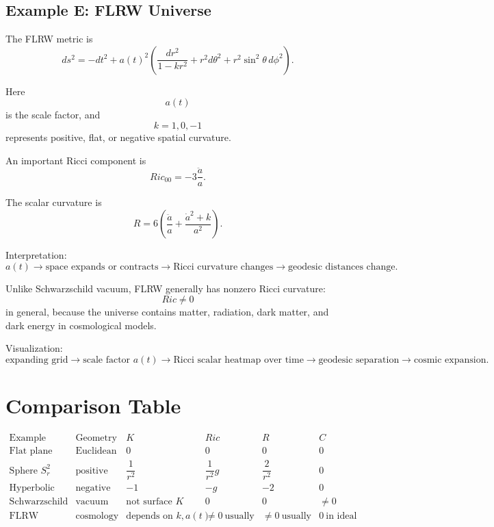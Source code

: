 \documentclass[12pt,a4paper]{article}
\theoremstyle{notespace}
\begin{document}
\subsection{Example E: FLRW Universe}

The FLRW metric is
\[
ds^2
=
-dt^2
+
a(t)^2
\left(
\frac{dr^2}{1-kr^2}
+
r^2d\theta^2
+
r^2\sin^2\theta\,d\phi^2
\right).
\]

Here
\[
a(t)
\]
is the scale factor, and
\[
k=1,0,-1
\]
represents positive, flat, or negative spatial curvature.

An important Ricci component is
\[
Ric_{00}
=
-3\frac{\ddot a}{a}.
\]

The scalar curvature is
\[
R
=
6\left(
\frac{\ddot a}{a}
+
\frac{\dot a^2+k}{a^2}
\right).
\]

Interpretation:
\[
a(t)
\longrightarrow
\text{space expands or contracts}
\longrightarrow
\text{Ricci curvature changes}
\longrightarrow
\text{geodesic distances change}.
\]

Unlike Schwarzschild vacuum, FLRW generally has nonzero Ricci curvature:
\[
\boxed{
	Ric\neq0
}
\]
in general, because the universe contains matter, radiation, dark matter, and dark energy in cosmological models.

Visualization:
\[
\text{expanding grid}
\longrightarrow
\text{scale factor }a(t)
\longrightarrow
\text{Ricci scalar heatmap over time}
\longrightarrow
\text{geodesic separation}
\longrightarrow
\text{cosmic expansion}.
\]

\section{Comparison Table}

\[
\begin{array}{c|c|c|c|c|c}
	\text{Example}
	&
	\text{Geometry}
	&
	K
	&
	Ric
	&
	R
	&
	C
	\\
	\hline
	\text{Flat plane}
	&
	\text{Euclidean surface}
	&
	0
	&
	0
	&
	0
	&
	0
	\\
	\text{Sphere }S^2_r
	&
	\text{positive curvature surface}
	&
	\dfrac1{r^2}
	&
	\dfrac1{r^2}g
	&
	\dfrac2{r^2}
	&
	0
	\\
	\text{Hyperbolic plane}
	&
	\text{negative curvature surface}
	&
	-1
	&
	-g
	&
	-2
	&
	0
	\\
	\text{Schwarzschild}
	&
	\text{vacuum spacetime}
	&
	\text{not surface }K
	&
	0
	&
	0
	&
	\neq0
	\\
	\text{FLRW universe}
	&
	\text{cosmology}
	&
	\text{depends on }k,a(t)
	&
	\neq0\ \text{usually}
	&
	\neq0\ \text{usually}
	&
	0\ \text{in ideal FLRW}
\end{array}
\]
\end{document}
